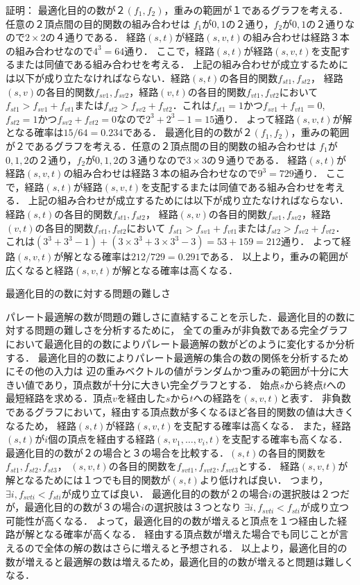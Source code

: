 \documentclass[12pt]{optlab-bachelor}
\begin{document}
証明：
最適化目的の数が２$(f_1,f_2)$，重みの範囲が１であるグラフを考える．任意の２頂点間の目的関数の組み合わせは
$f_1$が$0,1$の２通り，$f_2$が$0,1$の２通りなので$2 \times 2$の４通りである．
経路$(s,t)$が経路$(s,v,t)$の組み合わせは経路３本の組み合わせなので$4^3 = 64$通り．
ここで，経路$(s,t)$が経路$(s,v,t)$を支配するまたは同値である組み合わせを考える．
上記の組み合わせが成立するためには以下が成り立たなければならない．経路$(s,t)$の各目的関数$f_{st1},f_{st2}$，
経路$(s,v)$の各目的関数$f_{sv1},f_{sv2}$，経路$(v,t)$の各目的関数$f_{vt1},f_{vt2}$において
$f_{st1}>f_{sv1}+f_{vt1}$または$f_{st2}>f_{sv2}+f_{vt2}$．これは$f_{st1}=1$かつ$f_{sv1}+f_{vt1}=0$,
$f_{st2}=1$かつ$f_{sv2}+f_{vt2}=0$なので$2^3+2^3-1=15$通り．
よって経路$(s,v,t)$が解となる確率は$15/64=0.234$である．
最適化目的の数が２$(f_1,f_2)$，重みの範囲が２であるグラフを考える．任意の２頂点間の目的関数の組み合わせは
$f_1$が$0,1,2$の２通り，$f_2$が$0,1,2$の３通りなので$3 \times 3$の９通りである．
経路$(s,t)$が経路$(s,v,t)$の組み合わせは経路３本の組み合わせなので$9^3 = 729$通り．
ここで，経路$(s,t)$が経路$(s,v,t)$を支配するまたは同値である組み合わせを考える．
上記の組み合わせが成立するためには以下が成り立たなければならない．経路$(s,t)$の各目的関数$f_{st1},f_{st2}$，
経路$(s,v)$の各目的関数$f_{sv1},f_{sv2}$，経路$(v,t)$の各目的関数$f_{vt1},f_{vt2}$において
$f_{st1}>f_{sv1}+f_{vt1}$または$f_{st2}>f_{sv2}+f_{vt2}$．
これは$(3^3+3^3-1)+(3 \times 3^3 + 3 \times 3^3 - 3)=53+159=212$通り．
よって経路$(s,v,t)$が解となる確率は$212/729=0.291$である．
以上より，重みの範囲が広くなると経路$(s,v,t)$が解となる確率は高くなる．

\begin{description}
  \item[最適化目的の数に対する問題の難しさ]
\end{description}

パレート最適解の数が問題の難しさに直結することを示した．最適化目的の数に対する問題の難しさを分析するために，
全ての重みが非負数である完全グラフにおいて最適化目的の数によりパレート最適解の数がどのように変化するか分析する．
最適化目的の数によりパレート最適解の集合の数の関係を分析するためにその他の入力は
辺の重みベクトルの値がランダムかつ重みの範囲が十分に大きい値であり，頂点数が十分に大きい完全グラフとする．
始点$s$から終点$t$への最短経路を求める．頂点$v$を経由した$s$から$t$への経路を$(s,v,t)$と表す．
非負数であるグラフにおいて，経由する頂点数が多くなるほど各目的関数の値は大きくなるため，
経路$(s,t)$が経路$(s,v,t)$を支配する確率は高くなる．
また，経路$(s,t)$が$i$個の頂点を経由する経路$(s,v_1,\ldots,v_i,t)$を支配する確率も高くなる．
最適化目的の数が２の場合と３の場合を比較する．$(s,t)$の各目的関数を$f_{st1},f_{st2},f_{st3}$，
$(s,v,t)$の各目的関数を$f_{svt1},f_{svt2},f_{svt3}$とする．
経路$(s,v,t)$が解となるためには１つでも目的関数が$(s,t)$より低ければ良い．
つまり，$\exists i ,f_{svti}<f_{sti}$が成り立てば良い．
最適化目的の数が２の場合$i$の選択肢は２つだが，最適化目的の数が３の場合$i$の選択肢は３つとなり
$\exists i ,f_{svti}<f_{sti}$が成り立つ可能性が高くなる．
よって，最適化目的の数が増えると頂点を１つ経由した経路が解となる確率が高くなる．
経由する頂点数が増えた場合でも同じことが言えるので全体の解の数はさらに増えると予想される．
以上より，最適化目的の数が増えると最適解の数は増えるため，最適化目的の数が増えると問題は難しくなる．
\end{document}

